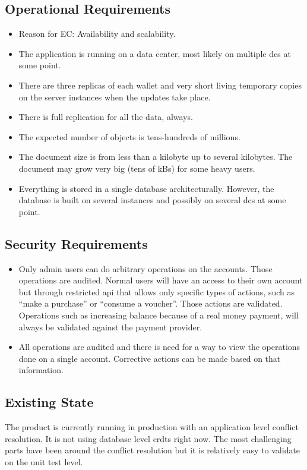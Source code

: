 \documentclass[11pt,a4paper]{report}
\begin{document}
\subsection{Operational Requirements}
\begin{itemize}
\item Reason for EC: Availability and scalability.
\item The application is running on a data center, most likely on multiple \glspl{dc} at some point.
\item There are three replicas of each wallet and very short living temporary copies on the server instances when the updates take place.
\item There is full replication for all the data, always.
\item The expected number of objects is tens-hundreds of millions.
\item The document size is from less than a kilobyte up to several kilobytes. The document may grow very big (tens of kBs) for some heavy users.
\item Everything is stored in a single database architecturally. However, the database is built on several instances and possibly on several \glspl{dc} at some point.
\end{itemize}
\subsection{Security Requirements}
\begin{itemize}
\item Only admin users can do arbitrary operations on the accounts. Those operations are audited. Normal users will have an access to their own account but through restricted \gls{api} that allows only specific types of actions, such as ``make a purchase'' or ``consume a voucher''. Those actions are validated. Operations such as increasing balance because of a real money payment, will always be validated against the payment provider.
\item All operations are audited and there is need for a way to view the operations done on a single account. Corrective actions can be made based on that information.
\end{itemize}

\subsection{Existing State}
The product is currently running in production with an application level conflict resolution. It is not using database level \glspl{crdt} right now. The most challenging parts have been around the conflict resolution but it is relatively easy to validate on the unit test level.
\end{document}
